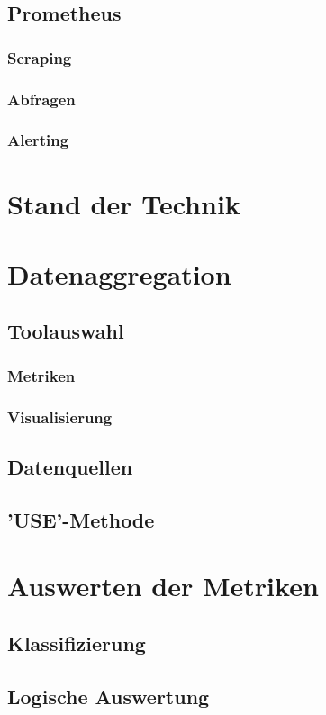 \documentclass[a4paper,12pt]{scrartcl}
\begin{document}
\subsection{Prometheus}
\subsubsection{Scraping}
\subsubsection{Abfragen}
\subsubsection{Alerting}

\section{Stand der Technik}

\section{Datenaggregation}
\subsection{Toolauswahl}
\subsubsection{Metriken}
\subsubsection{Visualisierung}
\subsection{Datenquellen}
\subsection{'USE'-Methode}

\section{Auswerten der Metriken}
\subsection{Klassifizierung}
\subsection{Logische Auswertung}
\end{document}
